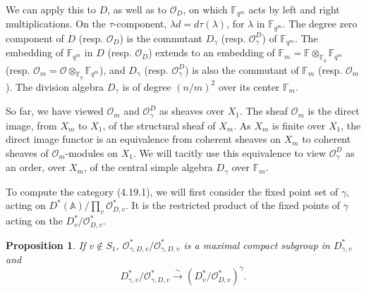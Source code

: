 \documentclass[11pt,a4paper]{article}
\theoremstyle{plain}
\newtheorem{proposition}[theorem]{Proposition}
\theoremstyle{definition}
\newcommand{\Fq}{\mathbb{F}_q}
\newcommand{\F}{\mathbb{F}}
\begin{document}
We can apply this to $D$, as well as to $\mathcal{O}_D$, on which $\F_{q^m}$ acts by left and right multiplications. On the $\tau$-component, $\lambda d = d \tau(\lambda)$, for $\lambda$ in $\F_{q^m}$. The degree zero component of $D$ (resp. $\mathcal{O}_D$) is the commutant $D_\gamma$ (resp. $\mathcal{O}_\gamma^D$) of $\F_{q^m}$. The embedding of $\F_{q^m}$ in $D$ (resp. $\mathcal{O}_D$) extends to an embedding of $\mathbb{F}_m = \mathbb{F} \otimes_{\Fq} \F_{q^m}$ (resp. $\mathcal{O}_m = \mathcal{O} \otimes_{\Fq} \F_{q^m}$), and $D_\gamma$ (resp. $\mathcal{O}_\gamma^D$) is also the commutant of $\mathbb{F}_m$ (resp. $\mathcal{O}_m$). The division algebra $D_\gamma$ is of degree $(n/m)^2$ over its center $\mathbb{F}_m$.

So far, we have viewed $\mathcal{O}_m$ and $\mathcal{O}_\gamma^D$ as sheaves over $X_1$. The sheaf $\mathcal{O}_m$ is the direct image, from $X_m$ to $X_1$, of the structural sheaf of $X_m$. As $X_m$ is finite over $X_1$, the direct image functor is an equivalence from coherent sheaves on $X_m$ to coherent sheaves of $\mathcal{O}_m$-modules on $X_1$. We will tacitly use this equivalence to view $\mathcal{O}_\gamma^D$ as an order, over $X_m$, of the central simple algebra $D_\gamma$ over $\mathbb{F}_m$.

To compute the category (4.19.1), we will first consider the fixed point set of $\gamma$, acting on $D^*(\mathbb{A}) / \prod_v \mathcal{O}_{D,v}^*$. It is the restricted product of the fixed points of $\gamma$ acting on the $D_v^*/\mathcal{O}_{D,v}^*$.

\begin{proposition}
If $v \notin S_1$, $\mathcal{O}_{\gamma,D,v}^*/\mathcal{O}_{\gamma,D,v}^*$ is a maximal compact subgroup in $D_{\gamma,v}^*$ and
\[
D_{\gamma,v}^*/\mathcal{O}_{\gamma,D,v}^* \xrightarrow{\sim} (D_v^*/\mathcal{O}_{D,v}^*)^\gamma.
\]
\end{proposition}
\end{document}
